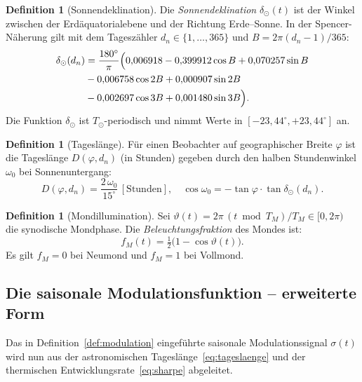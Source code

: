 ﻿\documentclass[12pt, a4paper]{article}
\theoremstyle{definition}
\newtheorem{definition}[theorem]{Definition}
\begin{document}
\begin{definition}[Sonnendeklination]\label{def:deklination}
Die \emph{Sonnendeklination} $\delta_{\odot}(t)$ ist der Winkel zwischen der
Erdäquatorialebene und der Richtung Erde--Sonne. In der Spencer-Näherung gilt
mit dem Tageszähler $d_n \in \{1,\ldots,365\}$ und $B = 2\pi(d_n - 1)/365$:
\begin{align*}\label{eq:deklination}
  \delta_{\odot}(d_n) &= \frac{180^\circ}{\pi}\Bigl( 
    0{,}006918 - 0{,}399912\cos B + 0{,}070257\sin B \\
    &- 0{,}006758\cos 2B + 0{,}000907\sin 2B \\
    &- 0{,}002697\cos 3B + 0{,}001480\sin 3B
  \Bigr).
\end{align*}
Die Funktion $\delta_{\odot}$ ist $T_{\odot}$-periodisch und nimmt Werte in
$[-23{,}44^\circ, +23{,}44^\circ]$ an.
\end{definition}

\begin{definition}[Tageslänge]\label{def:tageslaenge}
Für einen Beobachter auf geographischer Breite $\varphi$ ist die Tageslänge
$D(\varphi, d_n)$ (in Stunden) gegeben durch den halben Stundenwinkel
$\omega_0$ bei Sonnenuntergang:
\begin{equation}\label{eq:tageslaenge}
  D(\varphi, d_n) = \frac{2\,\omega_0}{15^\circ}\,[\text{Stunden}],\quad
  \cos\omega_0 = -\tan\varphi\cdot\tan\delta_{\odot}(d_n).
\end{equation}
\end{definition}

\begin{definition}[Mondillumination]\label{def:mondillumination}
Sei $\vartheta(t) = 2\pi\, (t \bmod T_M)/T_M \in [0, 2\pi)$ die synodische
Mondphase. Die \emph{Beleuchtungsfraktion} des Mondes ist:
\begin{equation}\label{eq:illumination}
  f_M(t) = \tfrac{1}{2}\bigl(1 - \cos\vartheta(t)\bigr).
\end{equation}
Es gilt $f_M = 0$ bei Neumond und $f_M = 1$ bei Vollmond.
\end{definition}

\subsection{Die saisonale Modulationsfunktion -- erweiterte Form}

Das in Definition~\ref{def:modulation} eingeführte saisonale Modulationssignal
$\sigma(t)$ wird nun aus der astronomischen Tageslänge~\eqref{eq:tageslaenge}
und der thermischen Entwicklungsrate~\eqref{eq:sharpe} abgeleitet.
\end{document}
